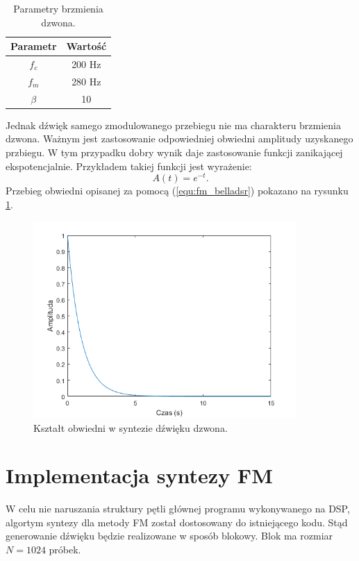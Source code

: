 \begin{table}[h!]
\centering
	\begin{tabular}{ |c| c| }
	\hline
	Parametr & Wartość \\
	\hline
	$f_c$ & 200 Hz \\
	\hline
	$f_m$ & 280 Hz\\
	\hline
	$\beta$ & 10\\
	\hline
	
	\end{tabular}
\captionsetup{justification=centering}
\label{tab:fm_bell}
\caption{Parametry brzmienia dzwona.}
\end{table}
Jednak dźwięk samego zmodulowanego przebiegu nie ma charakteru brzmienia dzwona. Ważnym jest zastosowanie odpowiedniej obwiedni amplitudy uzyskanego przbiegu. W tym przypadku dobry wynik daje zastosowanie funkcji zanikającej ekspotencjalnie. Przykładem takiej funkcji jest wyrażenie:
\begin{equation} \label{equ:fm_belladsr}
A(t) = e^{-t}.
\end{equation}
Przebieg obwiedni opisanej za pomocą (\ref{equ:fm_belladsr}) pokazano na rysunku \ref{rys:fm_belladsr}.
\begin{figure}[H]
	\centering
	\includegraphics[width=10cm]{grafiki/fm_belladsr}
	\captionsetup{justification=centering}
	\caption{Kształt obwiedni w syntezie dźwięku dzwona.}
	\label{rys:fm_belladsr}
\end{figure}

\section{Implementacja syntezy FM}
W celu nie naruszania struktury pętli głównej programu wykonywanego na DSP, algortym syntezy dla metody FM został dostosowany do istniejącego kodu. Stąd generowanie dźwięku będzie realizowane w sposób blokowy. Blok ma rozmiar $N = 1024$ próbek. 
